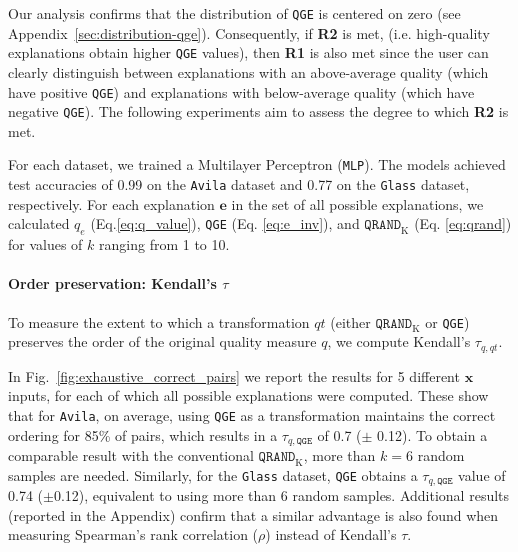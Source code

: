 Our analysis confirms that the distribution of \texttt{QGE} is centered on zero (see Appendix~\ref{sec:distribution-qge}). Consequently, if \textbf{R2} is met, (i.e. high-quality explanations obtain higher \texttt{QGE} values), then \textbf{R1} is also met since the user can clearly distinguish between explanations with an above-average quality (which have positive \texttt{QGE}) and explanations with below-average quality (which have negative \texttt{QGE}). The following experiments aim to assess the degree to which \textbf{R2} is met.

For each dataset, we trained a Multilayer Perceptron (\texttt{MLP}). The models achieved test accuracies of 0.99 on the \texttt{Avila} dataset and 0.77 on the \texttt{Glass} dataset, respectively. For each explanation $\mathbf{e}$ in the set of all possible explanations, we calculated $q_e$ (Eq.\ref{eq:q_value}), \texttt{QGE} (Eq. \ref{eq:e_inv}), and $\texttt{QRAND}_{\text{K}}$ (Eq. \ref{eq:qrand}) for values of $k$ ranging from 1 to 10.


\paragraph{Order preservation: Kendall's $\tau$}

To measure the extent to which a transformation $qt$ (either $\texttt{QRAND}_{\text{K}}$ or \texttt{QGE}) preserves the order of the original quality measure $q$, we compute Kendall's $\tau_{q,qt}$. 

In Fig.~\ref{fig:exhaustive_correct_pairs} we report the results for 5 different $\mathbf{x}$ inputs, for each of which all possible explanations were computed. These show that for \texttt{Avila}, on average, using \texttt{QGE} as a transformation maintains the correct ordering for 85\% of pairs, which results in a $\tau_{q,\texttt{QGE}}$ of 0.7 ($\pm$ 0.12). To obtain a comparable result with the conventional $\texttt{QRAND}_{\text{K}}$, more than $k=6$ random samples are needed. Similarly, for the \texttt{Glass} dataset, \texttt{QGE} obtains a $\tau_{q,\texttt{QGE}}$ value of 0.74 ($\pm$0.12), equivalent to using more than 6 random samples. Additional results (reported in the Appendix) confirm that a similar advantage is also found when measuring Spearman's rank correlation ($\rho$) instead of Kendall's $\tau$.

